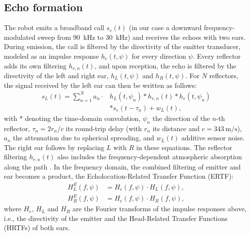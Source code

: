 \documentclass[journal]{IEEEtran}
\begin{document}
\subsection{Echo formation}
The robot emits a broadband call $s_e(t)$ (in our case a downward frequency-modulated sweep from \SI{90}{\kilo\hertz} to \SI{30}{\kilo\hertz}) and receives the echoes with two ears. During emission, the call is filtered by the directivity of the emitter transducer, modeled as an impulse response $h_e(t,\psi)$ for every direction $\psi$. Every reflector adds its own filtering $h_{r,n}(t)$, and upon reception, the echo is filtered by the directivity of the left and right ear, $h_L(t,\psi)$ and $h_R(t,\psi)$. For $N$ reflectors, the signal received by the left ear can then be written as follows:
\begin{equation}
\begin{aligned}
s_L(t) = \sum_{n=1}^{N} a_n \cdot {}& h_L(t,\psi_n) * h_{r,n}(t) * h_e(t,\psi_n) \\
& * s_e(t - \tau_n) + w_L(t),
\end{aligned}
\label{eq:echo}
\end{equation}
%
with $*$ denoting the time-domain convolution, $\psi_n$ the direction of the $n$-th reflector, $\tau_n = 2 r_n / c$ its round-trip delay (with $r_n$ its distance and $c = \SI{343}{\meter\per\second}$), $a_n$ the attenuation due to spherical spreading, and $w_L(t)$ additive sensor noise. The right ear follows by replacing $L$ with $R$ in these equations. The reflector filtering $h_{r,n}(t)$ also includes the frequency-dependent atmospheric absorption along the path \cite{iso9613AcousticsAttenuationSound1993}. In the frequency domain, the combined filtering of emitter and ear becomes a product, the Echolocation-Related Transfer Function (ERTF):
\begin{equation}
\begin{aligned}
H^E_L(f,\psi) &= H_e(f,\psi) \cdot H_L(f,\psi), \\
H^E_R(f,\psi) &= H_e(f,\psi) \cdot H_R(f,\psi),
\end{aligned}
\end{equation}
%
where $H_e$, $H_L$ and $H_R$ are the Fourier transforms of the impulse responses above, i.e., the directivity of the emitter and the Head-Related Transfer Functions (HRTFs) of both ears. 
\end{document}
